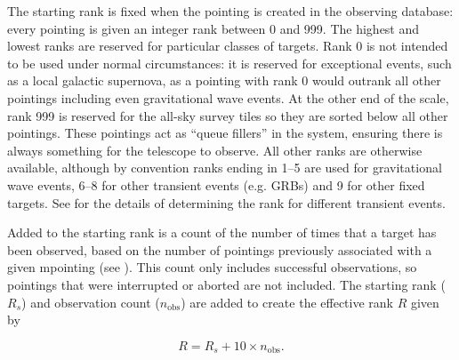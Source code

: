 \begin{colsection}
\begin{colsection}
The starting rank is fixed when the pointing is created in the observing database: every pointing is given an integer rank between 0 and 999. The highest and lowest ranks are reserved for particular classes of targets. Rank 0 is not intended to be used under normal circumstances: it is reserved for exceptional events, such as a local galactic supernova, as a pointing with rank 0 would outrank all other pointings including even gravitational wave events. At the other end of the scale, rank 999 is reserved for the all-sky survey tiles so they are sorted below all other pointings. These pointings act as ``queue fillers'' in the system, ensuring there is always something for the telescope to observe. All other ranks are otherwise available, although by convention ranks ending in 1--5 are used for gravitational wave events, 6--8 for other transient events (e.g. GRBs) and 9 for other fixed targets. See  for the details of determining the rank for different transient events.

Added to the starting rank is a count of the number of times that a target has been observed, based on the number of pointings previously associated with a given mpointing (see ). This count only includes successful observations, so pointings that were interrupted or aborted are not included. The starting rank ($R_s$) and observation count ($n_\text{obs}$) are added to create the effective rank $R$ given by

\begin{equation}
    R = R_s + 10\times n_\text{obs}.
    \label{eq:effective_rank}
\end{equation}


\end{colsection}
\end{colsection}
